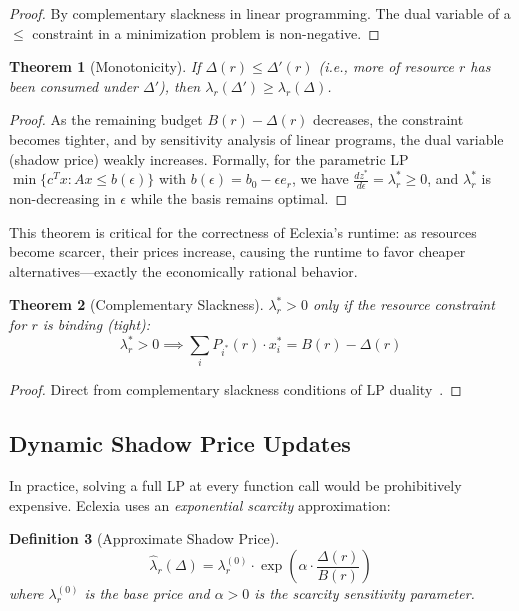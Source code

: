 \documentclass[11pt,a4paper]{article}
\newtheorem{theorem}{Theorem}[section]
\newtheorem{definition}[theorem]{Definition}
\begin{document}
\begin{proof}
By complementary slackness in linear programming.  The dual variable of a
$\leq$ constraint in a minimization problem is non-negative.
\end{proof}

\begin{theorem}[Monotonicity]
\label{thm:monotonicity}
If $\Delta(r) \leq \Delta'(r)$ (i.e., more of resource $r$ has been consumed
under $\Delta'$), then $\lambda_r(\Delta') \geq \lambda_r(\Delta)$.
\end{theorem}

\begin{proof}
As the remaining budget $B(r) - \Delta(r)$ decreases, the constraint becomes
tighter, and by sensitivity analysis of linear programs, the dual variable
(shadow price) weakly increases.  Formally, for the parametric LP
$\min\{c^T x : Ax \leq b(\epsilon)\}$ with $b(\epsilon) = b_0 - \epsilon e_r$,
we have $\frac{dz^*}{d\epsilon} = \lambda_r^* \geq 0$, and
$\lambda_r^*$ is non-decreasing in $\epsilon$ while the basis remains
optimal.
\end{proof}

This theorem is critical for the correctness of Eclexia's runtime: as resources
become scarcer, their prices increase, causing the runtime to favor cheaper
alternatives---exactly the economically rational behavior.

\begin{theorem}[Complementary Slackness]
\label{thm:complementary-slackness}
$\lambda_r^* > 0$ only if the resource constraint for $r$ is \emph{binding}
(tight):
\[
  \lambda_r^* > 0 \implies \sum_i P_{i^*}(r) \cdot x_i^* = B(r) - \Delta(r)
\]
\end{theorem}

\begin{proof}
Direct from complementary slackness conditions of LP duality~\cite{bertsimas1997}.
\end{proof}

\subsection{Dynamic Shadow Price Updates}

In practice, solving a full LP at every function call would be prohibitively
expensive.  Eclexia uses an \emph{exponential scarcity} approximation:

\begin{definition}[Approximate Shadow Price]
\label{def:approx-shadow}
\[
  \hat{\lambda}_r(\Delta) = \lambda_r^{(0)} \cdot
    \exp\!\left(\alpha \cdot \frac{\Delta(r)}{B(r)}\right)
\]
where $\lambda_r^{(0)}$ is the base price and $\alpha > 0$ is the scarcity
sensitivity parameter.
\end{definition}
\end{document}
